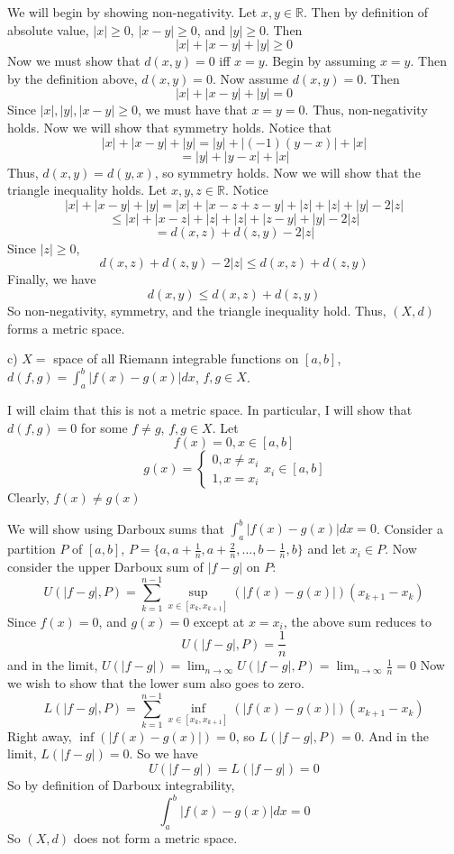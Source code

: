 \documentclass{article}
\begin{document}
\begin{enumerate}
    We will begin by showing non-negativity. Let $x,y \in \mathbb{R}$. Then by definition of absolute value, $|x| \geq 0$, $|x - y| \geq 0$, and $|y| \geq 0$. Then
    \[|x| + |x - y| + |y| \geq 0\]
    Now we must show that $d(x,y) = 0$ iff $x = y$. Begin by assuming $x = y$. Then by the definition above, $d(x,y) = 0$. Now assume $d(x,y) = 0$. Then
    \[|x| + |x - y| + |y| = 0\]
    Since $|x|,|y|, |x-y| \geq 0$, we must have that $x = y = 0$. Thus, non-negativity holds. Now we will show that symmetry holds. Notice that
    \[|x| + |x - y| + |y| = |y| + |(-1)(y - x)| + |x|\]
    \[ = |y| + |y - x| + |x|\]
    Thus, $d(x,y) = d(y,x)$, so symmetry holds. Now we will show that the triangle inequality holds. Let $x,y,z \in \mathbb{R}$. Notice
    \[|x| + |x - y| + |y| = |x| + |x - z + z - y| + |z| + |z| + |y| - 2|z|\]
    \[\leq |x| + |x - z| + |z| + |z| + |z - y| + |y| - 2|z|\]
    \[ = d(x,z) + d(z,y) - 2|z|\]
    Since $|z| \geq 0$,
    \[d(x,z) + d(z,y) - 2|z| \leq d(x,z) + d(z,y)\]
    Finally, we have
    \[d(x,y) \leq d(x,z) + d(z,y)\]
    So non-negativity, symmetry, and the triangle inequality hold. Thus, $(X,d)$ forms a metric space.
    \newline
    
    c) $X = $ space of all Riemann integrable functions on $[a,b]$, $d(f,g) = \int_{a}^b |f(x) - g(x)|dx$, $f,g \in X$.
    
    I will claim that this is not a metric space. In particular, I will show that $d(f,g) = 0$ for some $f \neq g$, $f,g \in X$. Let
    \[f(x) = 0, x \in [a,b]\]
    \[ g(x) = \begin{cases}
        0, x \neq x_i\\
        1, x = x_i
    \end{cases}
    x_i \in [a,b]
    \]
    Clearly, $f(x) \neq g(x)$
    
    
    We will show using Darboux sums that $\int_a^b |f(x) - g(x)|dx = 0$. Consider a partition $P$ of $[a,b]$, $P = \{a, a + \frac{1}{n}, a + \frac{2}{n}, \ldots, b - \frac{1}{n}, b\}$ and let $x_i \in P$. Now consider the upper Darboux sum of $|f - g|$ on $P$:
    \[U(|f - g|, P) = \sum_{k=1}^{n-1}\sup_{x \in [x_{k}, x_{k+1}]}{(|f(x) - g(x)|)}(x_{k+1} - x_k)\]
    Since $f(x) = 0$, and $g(x) = 0$ except at $x = x_i$, the above sum reduces to
    \[U(|f - g|, P) = \frac{1}{n}\]
    and in the limit, $U(|f - g|) = \lim_{n \to \infty}U(|f - g|, P) = \lim_{n \to \infty} \frac{1}{n} = 0$
    Now we wish to show that the lower sum also goes to zero.
    \[L(|f - g|, P) = \sum_{k = 1}^{n - 1} \inf_{x \in [x_k, x_{k+1}]}{(|f(x) - g(x)|)}(x_{k+1} - x_k)\]
    Right away, $\inf{(|f(x) - g(x)|)} = 0$, so $L(|f - g|, P) = 0$. And in the limit, $L(|f - g|) = 0$.
    So we have 
    \[U(|f - g|) = L(|f - g|) = 0\]
    So by definition of Darboux integrability,
    \[\int_a^b |f(x) - g(x)|dx = 0\]
    So $(X,d)$ does not form a metric space.
    \newline
    

\end{enumerate}
\end{document}
